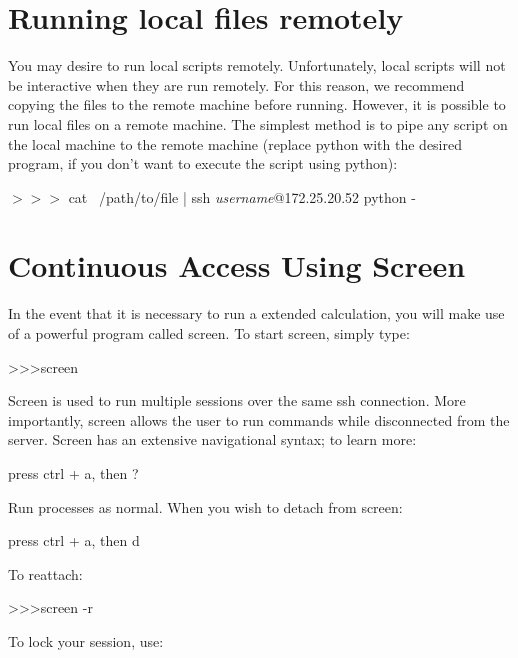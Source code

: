 \section{Running local files remotely}

You may desire to run local scripts remotely. Unfortunately, local scripts will not be interactive when they are run remotely. For this reason, we recommend copying the files to the remote machine before running. However, it is possible to run local files on a remote machine. The simplest method is to pipe any script on the local machine to the remote machine (replace python with the desired program, if you don't want to execute the script using python):

\begin{mdframed}
$>>>$ \quad cat ~/path/to/file | ssh \textit{username}@172.25.20.52 python -
\end{mdframed}

\section{Continuous Access Using Screen}
In the event that it is necessary to run a extended calculation, you will make use of a powerful program called screen. To start screen, simply type:

\begin{mdframed}
\textgreater\textgreater\textgreater \quad screen
\end{mdframed}

Screen is used to run multiple sessions over the same ssh connection. More importantly, screen allows the user to run commands while disconnected from the server. Screen has an extensive navigational syntax; to learn more:

\begin{mdframed}
press ctrl + a, then ?
\end{mdframed}

Run processes as normal. When you wish to detach from screen:

\begin{mdframed}
press ctrl + a, then d
\end{mdframed}

To reattach:

\begin{mdframed}
\textgreater\textgreater\textgreater \quad screen -r
\end{mdframed}

To lock your session, use:

